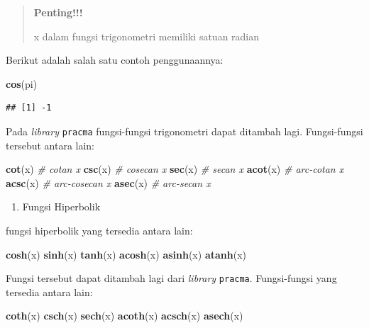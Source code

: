 \documentclass[]{book}
\newenvironment{Shaded}{\begin{snugshade}}{\end{snugshade}}
\newcommand{\CommentTok}[1]{\textcolor[rgb]{0.56,0.35,0.01}{\textit{#1}}}
\newcommand{\KeywordTok}[1]{\textcolor[rgb]{0.13,0.29,0.53}{\textbf{#1}}}
\newcommand{\NormalTok}[1]{#1}
\providecommand{\tightlist}{%
  \setlength{\itemsep}{0pt}\setlength{\parskip}{0pt}}
\theoremstyle{definition}
\theoremstyle{definition}
\theoremstyle{definition}
\theoremstyle{remark}
\begin{document}
\begin{quote}
\textbf{Penting!!!}

x dalam fungsi trigonometri memiliki satuan radian
\end{quote}

Berikut adalah salah satu contoh penggunaannya:

\begin{Shaded}
\begin{Highlighting}[]
\KeywordTok{cos}\NormalTok{(pi)}
\end{Highlighting}
\end{Shaded}

\begin{verbatim}
## [1] -1
\end{verbatim}

Pada \emph{library} \texttt{pracma} fungsi-fungsi trigonometri dapat ditambah lagi. Fungsi-fungsi tersebut antara lain:

\begin{Shaded}
\begin{Highlighting}[]
\KeywordTok{cot}\NormalTok{(x) }\CommentTok{# cotan x}
\KeywordTok{csc}\NormalTok{(x) }\CommentTok{# cosecan x}
\KeywordTok{sec}\NormalTok{(x) }\CommentTok{# secan x}
\KeywordTok{acot}\NormalTok{(x) }\CommentTok{# arc-cotan x}
\KeywordTok{acsc}\NormalTok{(x) }\CommentTok{# arc-cosecan x}
\KeywordTok{asec}\NormalTok{(x) }\CommentTok{# arc-secan x}
\end{Highlighting}
\end{Shaded}

\begin{enumerate}
\def\labelenumi{\arabic{enumi}.}
\setcounter{enumi}{2}
\tightlist
\item
  Fungsi Hiperbolik
\end{enumerate}

fungsi hiperbolik yang tersedia antara lain:

\begin{Shaded}
\begin{Highlighting}[]
\KeywordTok{cosh}\NormalTok{(x) }
\KeywordTok{sinh}\NormalTok{(x)}
\KeywordTok{tanh}\NormalTok{(x)}
\KeywordTok{acosh}\NormalTok{(x)}
\KeywordTok{asinh}\NormalTok{(x)}
\KeywordTok{atanh}\NormalTok{(x)}
\end{Highlighting}
\end{Shaded}

Fungsi tersebut dapat ditambah lagi dari \emph{library} \texttt{pracma}. Fungsi-fungsi yang tersedia antara lain:

\begin{Shaded}
\begin{Highlighting}[]
\KeywordTok{coth}\NormalTok{(x)}
\KeywordTok{csch}\NormalTok{(x)}
\KeywordTok{sech}\NormalTok{(x)}
\KeywordTok{acoth}\NormalTok{(x)}
\KeywordTok{acsch}\NormalTok{(x)}
\KeywordTok{asech}\NormalTok{(x)}
\end{Highlighting}
\end{Shaded}
\end{document}
